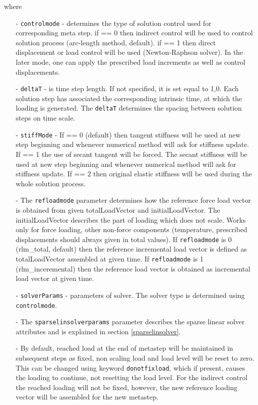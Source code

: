 \documentclass[a4paper]{report}
\newcommand{\param}[1]{\texttt{#1}} %
\begin{document}
where
\begin{itemize}
\item[-] \param{controlmode} - determines the type of solution
control used for corresponding meta step. if == 0 then indirect
control will be used to control solution process (arc-length method, default). if == 1
then direct displacement or load control will be used (Newton-Raphson solver). In the later
mode, one can apply the prescribed load increments as well as
control displacements.
\item[-] \param{deltaT} - is time step length. If not specified, it is
set equal to 1,0. Each solution step has associated the corresponding
intrinsic time, at which the loading is generated. The \param{deltaT}
determines the spacing between solution steps on time scale.
\item[-] \param{stiffMode} - If == 0 (default) then tangent stiffness will be used
at new step beginning and whenever numerical method will ask for
stiffness update. If == 1 the use of secant tangent will be forced.
The secant stiffness will be used at new step beginning
and whenever numerical method will ask for stiffness update.
If == 2 then original elastic stiffness will
be used during the whole solution process.
\item[-] The \param{refloadmode} parameter determines how the reference force load vector
is obtained from given totalLoadVector and initialLoadVector.
The initialLoadVector describes the part of loading which does not scale. Works only for force loading, other non-force components (temperature, prescribed displacements should always given in total values).
If \param{refloadmode} is 0 (rlm\_total, default) then the reference incremental load vector is defined as
totalLoadVector assembled at given time.
If \param{refloadmode} is 1 (rlm\_inceremental) then the reference load vector is
obtained as incremental load vector at given time.
\item[-] \param{solverParams} - parameters of solver. The solver type
is determined using \param{controlmode}.
\item[-] The  \param{sparselinsolverparams} parameter describes the sparse
linear solver attributes and is explained in section
\ref{sparselinsolver}.
\item[-] By default, reached load at the end of
metastep will be maintained in subsequent steps as fixed, non scaling
load and load level will be reset to zero. This can be changed using keyword \param{donotfixload}, which if
present, causes the loading to continue, not resetting the load
level. For the indirect control the reached loading will not be
fixed, however, the new reference loading vector will be assembled for
the new metastep.
\end{itemize}
\end{document}
